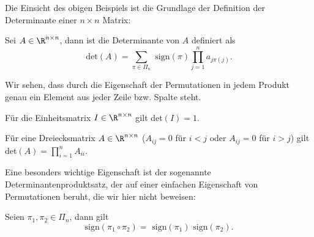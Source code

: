 Die Einsicht des obigen Beispiels ist die Grundlage der Definition der Determinante einer \(n \times n\) Matrix:
\label{vektorraeume/LGS:definition-12}
\begin{definition}{}{}



Sei \(A \in \R^{n \times n}\), dann ist die Determinante von \(A\) definiert als
\begin{equation*}
 \text{det}(A) = \sum_{\pi \in \Pi_n} \text{ sign}(\pi) \prod_{j=1}^n a_{j \pi(j)}.
\end{equation*}\end{definition}

Wir sehen, dass durch die Eigenschaft der Permutationen in jedem Produkt genau ein Element aus jeder Zeile bzw. Spalte steht.
\label{vektorraeume/LGS:example-13}
\begin{example}{}{}



Für die Einheitsmatrix \(I \in \R^{n \times n}\) gilt det\((I)=1\).
\end{example}
\label{vektorraeume/LGS:example-14}
\begin{example}{}{}



Für eine Dreiecksmatrix  \(A \in \R^{n \times n}\) (\(A_{ij} = 0\) für \(i< j\) oder \(A_{ij} = 0\) für \(i> j\)) gilt det\((A)=\prod_{i=1}^n A_{ii}\).
\end{example}

Eine besonders wichtige Eigenschaft ist der sogenannte Determinantenproduktsatz, der auf einer einfachen Eigenschaft von Permutationen beruht, die wir hier nicht beweisen:
\label{vektorraeume/LGS:lemma-15}
\begin{lemma}{}{}



Seien \(\pi_1, \pi_2 \in \Pi_n\), dann gilt
\begin{equation*}
  \text{sign}(\pi_1 \circ \pi_2) = \text{ sign}(\pi_1) \text{ sign}(\pi_2).
\end{equation*}\end{lemma}


